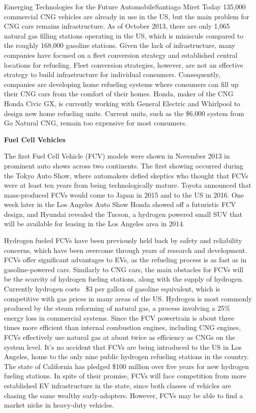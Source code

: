 \documentclass{papertex}
\begin{document}
\begin{news}{2}{Emerging Technologies for the Future Automobile}{Santiago Miret}{}{}
Today 135,000 commercial CNG vehicles are already in use in the US, but the main problem for CNG cars remains infrastructure. As of October 2013, there are only 1,065 natural gas filling stations operating in the US, which is miniscule compared to the roughly 168,000 gasoline stations. Given the lack of infrastructure, many companies have focused on a fleet conversion strategy and established central locations for refueling. Fleet conversion strategies, however, are not an effective strategy to build infrastructure for individual consumers. Consequently, companies are developing home refueling systems where consumers can fill up their CNG cars from the comfort of their homes. Honda, maker of the CNG Honda Civic GX, is currently working with General Electric and Whirlpool to design new home refueling units. Current units, such as the \$6,000 system from Go Natural CNG, remain too expensive for most consumers.

\textbf{Fuel Cell Vehicles}

The first Fuel Cell Vehicle (FCV) models were shown in November 2013 in prominent auto shows across two continents. The first showing occurred during the Tokyo Auto Show, where automakers defied skeptics who thought that FCVs were at least ten years from being technologically mature. Toyota announced that mass-produced FCVs would come to Japan in 2015 and to the US in 2016. One week later in the Los Angeles Auto Show Honda showed off a futuristic FCV design, and Hyundai revealed the Tucson, a hydrogen powered small SUV that will be available for leasing in the Los Angeles area in 2014.

Hydrogen fueled FCVs have been previously held back by safety and reliability concerns, which have been overcome through years of research and development. FCVs offer significant advantages to EVs, as the refueling process is as fast as in gasoline-powered cars. Similarly to CNG cars, the main obstacles for FCVs will be the scarcity of hydrogen fueling stations, along with the supply of hydrogen. Currently hydrogen costs ~\$3 per gallon of gasoline equivalent, which is competitive with gas prices in many areas of the US. Hydrogen is most commonly produced by the steam reforming of natural gas, a process involving a 25\% energy loss in commercial systems. Since the FCV powertrain is about three times more efficient than internal combustion engines, including CNG engines, FCVs effectively use natural gas at about twice as efficiency as CNGs on the system level. It's no accident that FCVs are being introduced to the US in Los Angeles, home to the only nine public hydrogen refueling stations in the country. The state of California has pledged \$100 million over five years for new hydrogen fueling stations. In spite of their promise, FCVs will face competition from more established EV infrastructure in the state, since both classes of vehicles are chasing the same wealthy early-adopters. However, FCVs may be able to find a market niche in heavy-duty vehicles.


\end{news}
\end{document}
